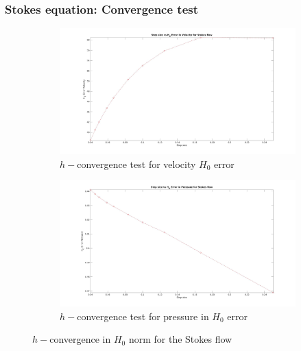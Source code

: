 \documentclass{beamer}
\begin{document}
\begin{frame}
\frametitle{Stokes equation: Convergence test}
\begin{figure}
\begin{subfigure}{0.4\textwidth}	
  \includegraphics[width=\linewidth]{h0_velocity_stokes.jpg}
  \caption{$h-$convergence test for velocity $H_0$ error}
  \label{fig:vel_stoke_conv_h0}
\end{subfigure}
\begin{subfigure}{0.4\textwidth}	
  \includegraphics[width=\linewidth]{h0_pressure_stokes.jpg}
  \caption{$h-$convergence test for pressure in $H_0$ error}
  \label{fig:pre_stoke_conv_h0}
\end{subfigure}
\caption{$h-$convergence in $H_0$ norm for the Stokes flow}
\end{figure}
\end{frame}
\end{document}
